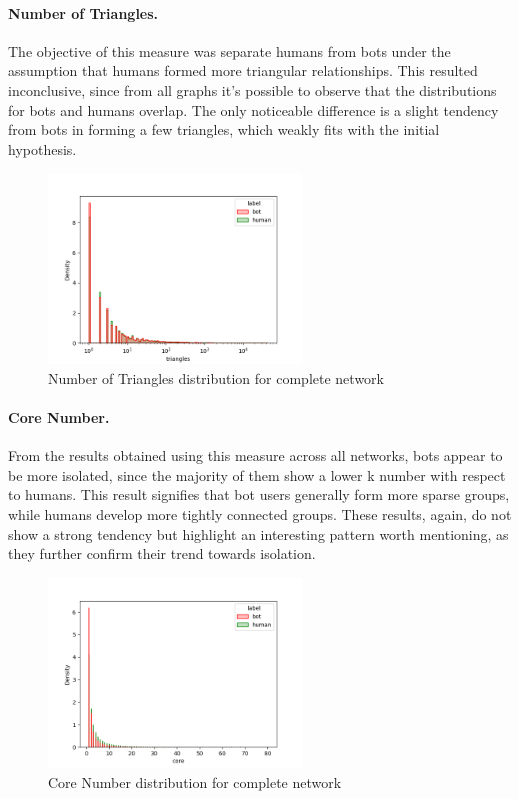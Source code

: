\documentclass[12pt, a4paper]{article}
\begin{document}
        \paragraph{Number of Triangles.} The objective of this measure was separate humans from bots under the assumption that humans formed more triangular relationships. This resulted inconclusive, since from all graphs it's possible to observe that the distributions for bots and humans overlap. The only noticeable difference is a slight tendency from bots in forming a few triangles, which weakly fits with the initial hypothesis.
        \begin{figure}[H]
        	\centering
            \includegraphics[width=0.6\textwidth]{results/complete_triangles.png}
            \caption{Number of Triangles distribution for complete network}
        \end{figure}
		\paragraph{Core Number.} From the results obtained using this measure across all networks, bots appear to be more isolated, since the majority of them show a lower k number with respect to humans. This result signifies that bot users generally form more sparse groups, while humans develop more tightly connected groups. These results, again, do not show a strong tendency but highlight an interesting pattern worth mentioning, as they further confirm their trend towards isolation.
		\begin{figure}[H]
        	\centering
            \includegraphics[width=0.6\textwidth]{results/complete_core.png}
            \caption{Core Number distribution for complete network}
        \end{figure}
\end{document}
